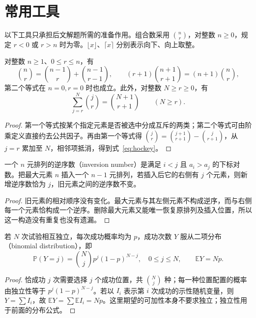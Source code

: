 \documentclass[UTF8,12pt,a4paper,fontset=fandol]{ctexart}
\begin{document}
\section{常用工具}\label{sec:tools}
以下工具只承担后文解题所需的准备作用。组合数采用 $\binom nr$，对整数 $n\geq0$，规定 $r<0$ 或 $r>n$ 时为零。$\lfloor x\rfloor$、$\lceil x\rceil$ 分别表示向下、向上取整。

\begin{lemma}[组合数的相邻关系与逐项累加]\label{lem:binomial}
对整数 $n\geq1$、$0\leq r\leq n$，有
\[
\binom nr=\binom{n-1}r+\binom{n-1}{r-1},\qquad
(r+1)\binom{n+1}{r+1}=(n+1)\binom nr,
\]
第二个等式在 $n=0,r=0$ 时也成立。此外，对整数 $N\geq r\geq0$，有
\begin{equation}\label{eq:hockey}
\sum_{j=r}^{N}\binom jr=\binom{N+1}{r+1}\qquad(N\geq r).
\end{equation}
\end{lemma}
\begin{proof}
第一个等式按某个指定元素是否被选中分成互斥的两类；第二个等式可由阶乘定义直接约去公共因子。再由第一个等式得 $\binom jr=\binom{j+1}{r+1}-\binom j{r+1}$，从 $j=r$ 累加至 $N$，相邻项抵消，得到式~\eqref{eq:hockey}。
\end{proof}

\begin{lemma}[插入最大元素与逆序数]\label{lem:insert}
一个 $n$ 元排列的逆序数（inversion number）是满足 $i<j$ 且 $a_i>a_j$ 的下标对数。把最大元素 $n$ 插入一个 $n-1$ 元排列，若插入后它的右侧有 $j$ 个元素，则新增逆序数恰为 $j$，旧元素之间的逆序数不变。
\end{lemma}
\begin{proof}
旧元素的相对顺序没有变化。最大元素与其左侧元素不构成逆序，而与右侧每一个元素恰构成一个逆序。删除最大元素又能唯一恢复原排列及插入位置，所以这一构造没有重复也没有遗漏。
\end{proof}

\begin{lemma}[相同成功率的独立试验]\label{lem:binomial-law}
若 $N$ 次试验相互独立，每次成功概率均为 $p$，成功次数 $Y$ 服从二项分布（binomial distribution），即
\[
\mathbb P(Y=j)=\binom Njp^j(1-p)^{N-j},\quad 0\leq j\leq N,
\qquad \mathbb E Y=Np.
\]
\end{lemma}
\begin{proof}
恰成功 $j$ 次需要选择 $j$ 个成功位置，共 $\binom Nj$ 种；每一种位置配置的概率由独立性等于 $p^j(1-p)^{N-j}$。若以 $I_i$ 表示第 $i$ 次成功的示性随机变量，则 $Y=\sum I_i$，故 $\mathbb E Y=\sum\mathbb E I_i=Np$。这里期望的可加性本身不要求独立；独立性用于前面的分布公式。
\end{proof}
\end{document}
